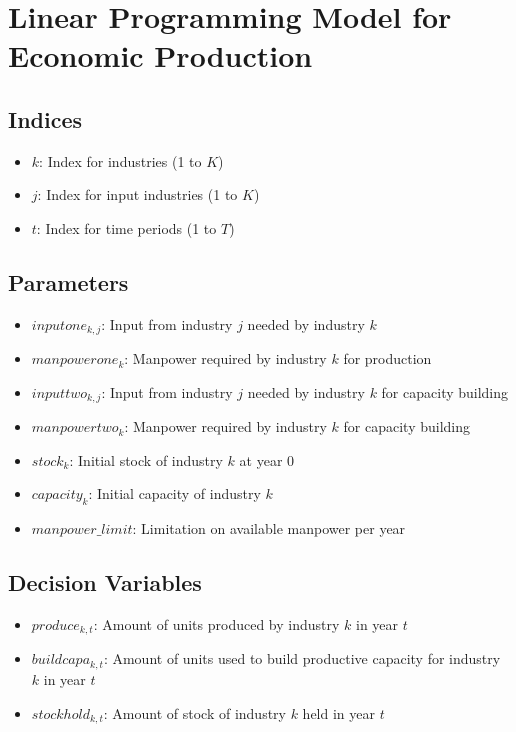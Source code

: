 \documentclass{article}
\begin{document}
\section*{Linear Programming Model for Economic Production}

\subsection*{Indices}
\begin{itemize}
    \item $k$: Index for industries (1 to $K$)
    \item $j$: Index for input industries (1 to $K$)
    \item $t$: Index for time periods (1 to $T$)
\end{itemize}

\subsection*{Parameters}
\begin{itemize}
    \item $inputone_{k, j}$: Input from industry $j$ needed by industry $k$
    \item $manpowerone_{k}$: Manpower required by industry $k$ for production
    \item $inputtwo_{k, j}$: Input from industry $j$ needed by industry $k$ for capacity building
    \item $manpowertwo_{k}$: Manpower required by industry $k$ for capacity building
    \item $stock_{k}$: Initial stock of industry $k$ at year 0
    \item $capacity_{k}$: Initial capacity of industry $k$
    \item $manpower\_limit$: Limitation on available manpower per year
\end{itemize}

\subsection*{Decision Variables}
\begin{itemize}
    \item $produce_{k, t}$: Amount of units produced by industry $k$ in year $t$
    \item $buildcapa_{k, t}$: Amount of units used to build productive capacity for industry $k$ in year $t$
    \item $stockhold_{k, t}$: Amount of stock of industry $k$ held in year $t$
\end{itemize}
\end{document}
